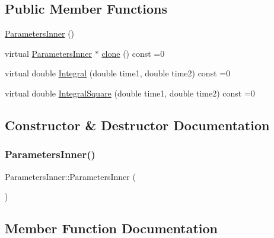 \subsection*{Public Member Functions}
\begin{DoxyCompactItemize}
\item 
\hyperlink{classParametersInner_a940f8f69d4ce2d2dc35e71a9cc05d85b}{Parameters\+Inner} ()
\item 
virtual \hyperlink{classParametersInner}{Parameters\+Inner} $\ast$ \hyperlink{classParametersInner_a421a238e889bfe41cc7db9d7e918d4b0}{clone} () const =0
\item 
virtual double \hyperlink{classParametersInner_ade3035097353fd2f38d3a20bf737d46a}{Integral} (double time1, double time2) const =0
\item 
virtual double \hyperlink{classParametersInner_a12e3be9c5daf0d6dc74a460905f1b46e}{Integral\+Square} (double time1, double time2) const =0
\end{DoxyCompactItemize}


\subsection{Constructor \& Destructor Documentation}
\hypertarget{classParametersInner_a940f8f69d4ce2d2dc35e71a9cc05d85b}{}\label{classParametersInner_a940f8f69d4ce2d2dc35e71a9cc05d85b} 
\subsubsection{\texorpdfstring{Parameters\+Inner()}{ParametersInner()}}
{\footnotesize\ttfamily Parameters\+Inner\+::\+Parameters\+Inner (\begin{DoxyParamCaption}{ }\end{DoxyParamCaption})\hspace{0.3cm}{\ttfamily [inline]}}



\subsection{Member Function Documentation}
\hypertarget{classParametersInner_a421a238e889bfe41cc7db9d7e918d4b0}{}\label{classParametersInner_a421a238e889bfe41cc7db9d7e918d4b0} 
